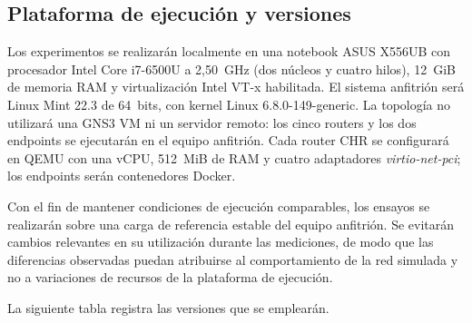 \documentclass[11pt,a4paper]{article}
\begin{document}
\subsection*{Plataforma de ejecuci\'on y versiones}

Los experimentos se realizar\'an localmente en una notebook ASUS X556UB con procesador Intel Core i7-6500U a 2,50~GHz (dos n\'ucleos y cuatro hilos), 12~GiB de memoria RAM y virtualizaci\'on Intel VT-x habilitada. El sistema anfitri\'on ser\'a Linux Mint 22.3 de 64~bits, con kernel Linux 6.8.0-149-generic. La topolog\'ia no utilizar\'a una GNS3 VM ni un servidor remoto: los cinco routers y los dos endpoints se ejecutar\'an en el equipo anfitri\'on. Cada router CHR se configurar\'a en QEMU con una vCPU, 512~MiB de RAM y cuatro adaptadores \textit{virtio-net-pci}; los endpoints ser\'an contenedores Docker.

Con el fin de mantener condiciones de ejecuci\'on comparables, los ensayos se realizar\'an sobre una carga de referencia estable del equipo anfitri\'on. Se evitar\'an cambios relevantes en su utilizaci\'on durante las mediciones, de modo que las diferencias observadas puedan atribuirse al comportamiento de la red simulada y no a variaciones de recursos de la plataforma de ejecuci\'on.

La siguiente tabla registra las versiones que se emplear\'an.
\end{document}
